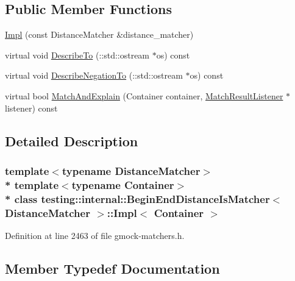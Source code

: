 \subsection*{Public Member Functions}
\begin{DoxyCompactItemize}
\item 
\hyperlink{classtesting_1_1internal_1_1_begin_end_distance_is_matcher_1_1_impl_a92f5afc23d317260d4a5bd091d2904a4}{Impl} (const Distance\+Matcher \&distance\+\_\+matcher)
\item 
virtual void \hyperlink{classtesting_1_1internal_1_1_begin_end_distance_is_matcher_1_1_impl_a623f029822276ab759b312519774e993}{Describe\+To} (\+::std\+::ostream $\ast$os) const 
\item 
virtual void \hyperlink{classtesting_1_1internal_1_1_begin_end_distance_is_matcher_1_1_impl_a7e2a6ddef3dd17a343b8dca9ec93adb7}{Describe\+Negation\+To} (\+::std\+::ostream $\ast$os) const 
\item 
virtual bool \hyperlink{classtesting_1_1internal_1_1_begin_end_distance_is_matcher_1_1_impl_a78763d6532f99d794f7e952076eb8e02}{Match\+And\+Explain} (Container container, \hyperlink{classtesting_1_1_match_result_listener}{Match\+Result\+Listener} $\ast$listener) const 
\end{DoxyCompactItemize}


\subsection{Detailed Description}
\subsubsection*{template$<$typename Distance\+Matcher$>$\\*
template$<$typename Container$>$\\*
class testing\+::internal\+::\+Begin\+End\+Distance\+Is\+Matcher$<$ Distance\+Matcher $>$\+::\+Impl$<$ Container $>$}



Definition at line 2463 of file gmock-\/matchers.\+h.



\subsection{Member Typedef Documentation}
